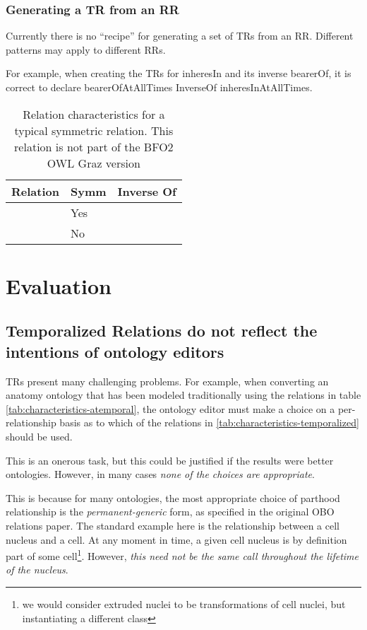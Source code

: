 \documentclass{bioinfo}
\def\adjacentTo{\pr{adjacent\_to}}
\def\atAllTimes{\pr{at-all-times}}
\def\atSomeTimes{\pr{at-some-times}}
\begin{document}
\subsubsection{Generating a TR from an RR}

Currently there is no ``recipe'' for generating a set of TRs from an
RR. Different patterns may apply to different RRs.

For example, when creating the TRs for inheresIn and its inverse
bearerOf, it is correct to declare bearerOfAtAllTimes InverseOf
inheresInAtAllTimes.




\begin{table}
\begin{tabular}{ | p{3cm} | p{1cm} | p{4cm} | }
\hline
\textbf{Relation} & \textbf{Symm} & \textbf{Inverse Of}  \\
\hline
\adjacentTo\ \atSomeTimes & Yes & \adjacentTo\ \atSomeTimes \\
\hline
\adjacentTo\ \atAllTimes & No & \\
\hline
\end{tabular}
\caption{Relation characteristics for a typical symmetric relation. This relation is not part of the BFO2 OWL Graz version}
\label{tab:characteristics-adj}
\end{table}


\section{Evaluation}

\subsection{Temporalized Relations do not reflect the intentions of
  ontology editors}

TRs present many challenging problems. For example, when converting an
anatomy ontology that has been modeled traditionally using the
relations in table \ref{tab:characteristics-atemporal}, the ontology
editor must make a choice on a per-relationship basis as to which of
the relations in \ref{tab:characteristics-temporalized} should be
used.

This is an onerous task, but this could be justified if the results
were better ontologies. However, in many cases \emph{none of the
  choices are appropriate}.

This is because for many ontologies, the most appropriate choice of
parthood relationship is the \emph{permanent-generic} form, as
specified in the original OBO relations paper. The standard example
here is the relationship between a cell nucleus and a cell. At any
moment in time, a given cell nucleus is by definition part of some
cell\footnote{we would consider extruded nuclei to be transformations
  of cell nuclei, but instantiating a different class}. However,
\emph{this need not be the same call throughout the lifetime of the
  nucleus}.
\end{document}
